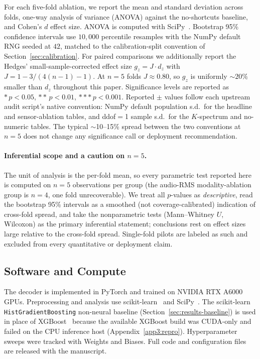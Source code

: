 \documentclass[sensors,article,submit,moreauthors,pdftex]{Definitions/mdpi}
\begin{document}
For each five-fold ablation, we report the mean and standard deviation across folds, one-way analysis of variance (ANOVA) against the no-shortcuts baseline, and Cohen's $d$ effect size. ANOVA is computed with SciPy~\cite{virtanen2020scipy}. Bootstrap 95\% confidence intervals use $10{,}000$ percentile resamples with the NumPy default RNG seeded at $42$, matched to the calibration-split convention of Section~\ref{sec:calibration}. For paired comparisons we additionally report the Hedges' small-sample-corrected effect size $g_z\!=\!J\!\cdot\!d_z$ with $J\!=\!1\!-\!3/(4(n\!-\!1)\!-\!1)$. At $n\!=\!5$ folds $J\!\approx\!0.80$, so $g_z$ is uniformly $\sim$$20\%$ smaller than $d_z$ throughout this paper. Significance levels are reported as $\ast\,p<0.05$, $\ast\ast\,p<0.01$, $\ast\ast\ast\,p<0.001$. Reported $\pm$ values follow each upstream audit script's native convention: NumPy default population s.d.\ for the headline and sensor-ablation tables, and ddof$=$1 sample s.d.\ for the $K$-spectrum and no-numeric tables. The typical $\sim$10--15\% spread between the two conventions at $n\!=\!5$ does not change any significance call or deployment recommendation.

\paragraph{Inferential scope and a caution on $n=5$.} The unit of analysis is the per-fold mean, so every parametric test reported here is computed on $n=5$ observations per group (the audio-RMS modality-ablation group is $n=4$, one fold unrecoverable). We treat all $p$-values as \emph{descriptive}, read the bootstrap 95\% intervals as a smoothed (not coverage-calibrated) indication of cross-fold spread, and take the nonparametric tests (Mann--Whitney $U$, Wilcoxon) as the primary inferential statement; conclusions rest on effect sizes large relative to the cross-fold spread. Single-fold pilots are labeled as such and excluded from every quantitative or deployment claim.

\subsection{Software and Compute}
\label{sec:software}

The decoder is implemented in PyTorch and trained on NVIDIA RTX A6000 GPUs. Preprocessing and analysis use scikit-learn~\cite{pedregosa2011sklearn} and SciPy~\cite{virtanen2020scipy}. The scikit-learn \texttt{HistGradientBoosting} non-neural baseline (Section~\ref{sec:results-baseline}) is used in place of XGBoost~\cite{chen2016xgboost} because the available XGBoost build was CUDA-only and failed on the CPU inference host (Appendix~\ref{app3:repro}). Hyperparameter sweeps were tracked with Weights and Biases. Full code and configuration files are released with the manuscript.
\end{document}
